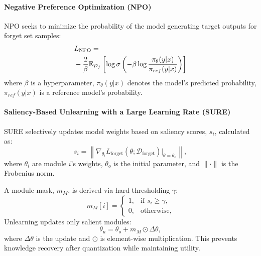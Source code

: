 \paragraph{Negative Preference Optimization (NPO)} NPO \citep{npo} seeks to minimize the probability of the model generating target outputs for forget set samples:
\begin{align}
&L_{\text{NPO}} = \notag \\
&-\frac{2}{\beta} \mathbb{E}_{\mathcal{D}_f} \left[ \log \sigma \left( -\beta \log \frac{\pi_\theta(y|x)}{\pi_{ref}(y|x)} \right) \right]
\end{align}
where \(\beta\) is a hyperparameter, \(\pi_\theta(y|x)\) denotes the model's predicted probability, \(\pi_{ref}(y|x)\) is a reference model's probability.

\paragraph{Saliency-Based Unlearning with a Large Learning Rate (SURE)} SURE\citep{zhang2024doesllmtrulyunlearn} selectively updates model weights based on saliency scores, \(s_i\), calculated as:
\[
    s_i = \left\| \nabla_{\theta_i} L_{\text{forget}}(\theta; \mathcal{D}_{\text{forget}}) \big|_{\theta=\theta_o} \right\|,
\]
where \( \theta_i \) are module \(i\)’s weights, \( \theta_o \) is the initial parameter, and \( \| \cdot \| \) is the Frobenius norm.

A module mask, \(m_M\), is derived via hard thresholding \( \gamma \):
\[
m_M[i] = \begin{cases}
1, & \text{if } s_i \geq \gamma, \\
0, & \text{otherwise},
\end{cases}
\]
Unlearning updates only salient modules:
\[
    \theta_u = \theta_o + m_M \odot \Delta \theta,
\]
where \( \Delta \theta \) is the update and \( \odot \) is element-wise multiplication. This prevents knowledge recovery after quantization while maintaining utility.




